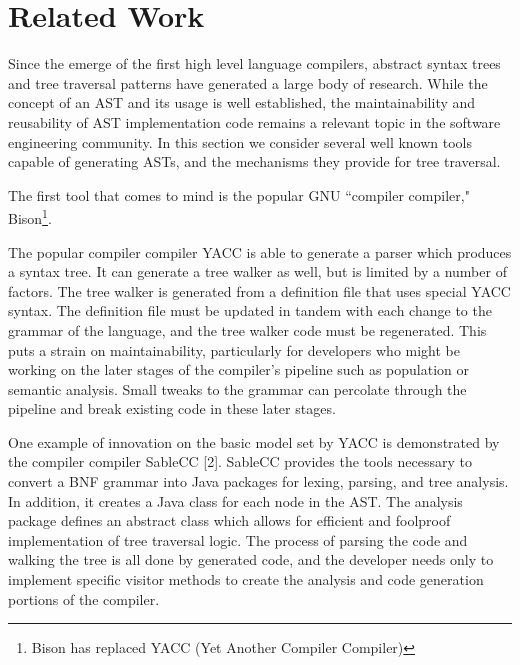 \documentclass[times]{speauth}
\begin{document}
\vspace{-6pt}


\section{Related Work}
\vspace{-2pt}

Since the emerge of the first high level language compilers, abstract syntax trees and tree traversal patterns have generated a large body of research. While the concept of an AST and its usage is well established, the maintainability and reusability of AST implementation code remains a relevant topic in the software engineering community. In this section we consider several well known tools capable of generating ASTs, and the mechanisms they provide for tree traversal.

The first tool that comes to mind is the popular GNU ``compiler compiler," Bison\footnote{Bison has replaced YACC (Yet Another Compiler Compiler)}. 

The popular compiler compiler YACC is able to generate a parser which produces a syntax tree. It can generate a tree walker as well, but is limited by a number of factors. The tree walker is generated from a definition file that uses special YACC syntax. The definition file must be updated in tandem with each change to the grammar of the language, and the tree walker code must be regenerated. This puts a strain on maintainability, particularly for developers who might be working on the later stages of the compiler's pipeline such as population or semantic analysis. Small tweaks to the grammar can percolate through the pipeline and break existing code in these later stages. 

One example of innovation on the basic model set by YACC is demonstrated by the compiler compiler SableCC [2]. SableCC provides the tools necessary to convert a BNF grammar into Java packages for lexing, parsing, and tree analysis. In addition, it creates a Java class for each node in the AST. The analysis package defines an abstract class which allows for efficient and foolproof implementation of tree traversal logic. The process of parsing the code and walking the tree is all done by generated code, and the developer needs only to implement specific visitor methods to create the analysis and code generation portions of the compiler.
\end{document}
